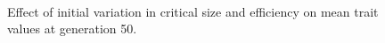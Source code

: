 \begin{figure}[p]
  \\
  \caption{Effect of initial variation in critical size and efficiency on mean trait values at generation 50.}
  \label{fig:ivar_mc_eff}
\end{figure}

